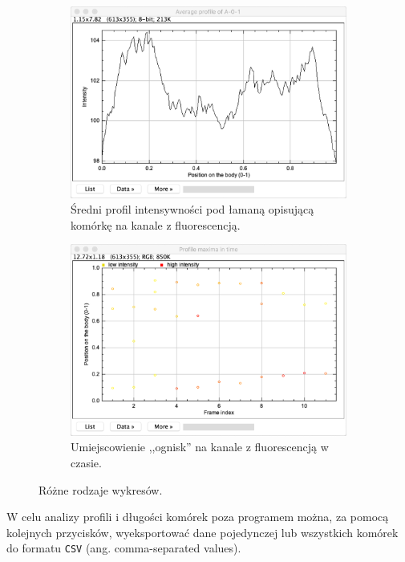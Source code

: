\documentclass[declaration,shortabstract,mgr]{iithesis}
\begin{document}
\begin{figure}
  \begin{subfigure}[t]{.45\textwidth}
    \centering
    \includegraphics[width=\textwidth]{images/ui-plot-avg-profile.png}
    \caption{\centering Średni profil intensywności pod łamaną opisującą komórkę na kanale z fluorescencją.}
  \end{subfigure}
  \hfill
  \begin{subfigure}[t]{.45\textwidth}
    \centering
    \includegraphics[width=\textwidth]{images/ui-plot-picks.png}
    \caption{\centering Umiejscowienie ,,ognisk'' na kanale z fluorescencją w czasie.}
  \end{subfigure}
  \hfill

  \caption{Różne rodzaje wykresów.}
  \label{fig:ui-plots}
\end{figure}

W celu analizy profili i długości komórek poza programem można, za pomocą kolejnych przycisków, wyeksportować dane pojedynczej lub wszystkich komórek do formatu \texttt{CSV} (ang. comma-separated values).
\end{document}
